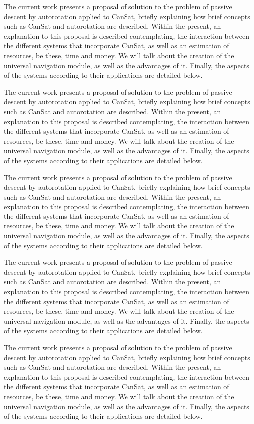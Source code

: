 The current work presents a proposal of solution to the problem of passive descent by autorotation applied to CanSat, briefly explaining how brief concepts such as CanSat and autorotation are described. Within the present, an explanation to this proposal is described contemplating, the interaction between the different systems that incorporate CanSat, as well as an estimation of resources, be these, time and money. We will talk about the creation of the universal navigation module, as well as the advantages of it. Finally, the aspects of the systems according to their applications are detailed below.

The current work presents a proposal of solution to the problem of passive descent by autorotation applied to CanSat, briefly explaining how brief concepts such as CanSat and autorotation are described. Within the present, an explanation to this proposal is described contemplating, the interaction between the different systems that incorporate CanSat, as well as an estimation of resources, be these, time and money. We will talk about the creation of the universal navigation module, as well as the advantages of it. Finally, the aspects of the systems according to their applications are detailed below.

The current work presents a proposal of solution to the problem of passive descent by autorotation applied to CanSat, briefly explaining how brief concepts such as CanSat and autorotation are described. Within the present, an explanation to this proposal is described contemplating, the interaction between the different systems that incorporate CanSat, as well as an estimation of resources, be these, time and money. We will talk about the creation of the universal navigation module, as well as the advantages of it. Finally, the aspects of the systems according to their applications are detailed below.

The current work presents a proposal of solution to the problem of passive descent by autorotation applied to CanSat, briefly explaining how brief concepts such as CanSat and autorotation are described. Within the present, an explanation to this proposal is described contemplating, the interaction between the different systems that incorporate CanSat, as well as an estimation of resources, be these, time and money. We will talk about the creation of the universal navigation module, as well as the advantages of it. Finally, the aspects of the systems according to their applications are detailed below.

The current work presents a proposal of solution to the problem of passive descent by autorotation applied to CanSat, briefly explaining how brief concepts such as CanSat and autorotation are described. Within the present, an explanation to this proposal is described contemplating, the interaction between the different systems that incorporate CanSat, as well as an estimation of resources, be these, time and money. We will talk about the creation of the universal navigation module, as well as the advantages of it. Finally, the aspects of the systems according to their applications are detailed below.